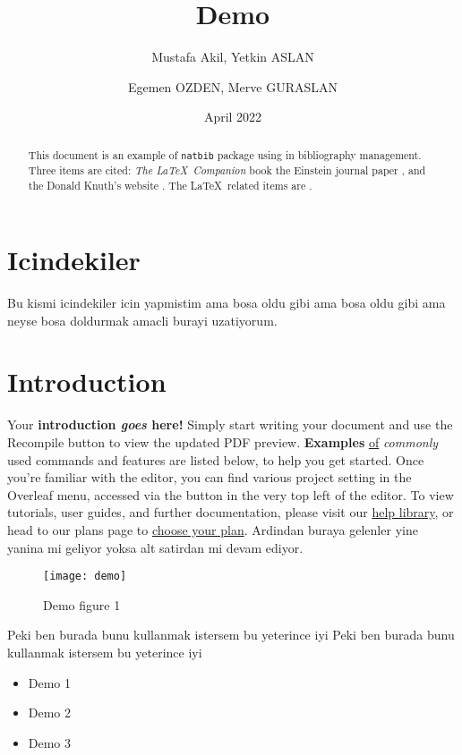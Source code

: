 \documentclass[12pt]{article}
\title{Demo}
\author{Mustafa Akil, Yetkin ASLAN}
\author{Egemen OZDEN, Merve GURASLAN}
\date{April 2022}
\begin{document}
\maketitle

\tableofcontents \newpage

\begin{abstract}
This document is an example of \texttt{natbib} package using in bibliography
management. Three items are cited: \textit{The \LaTeX\ Companion} book 
 the Einstein journal paper \cite{einstein}, and the 
Donald Knuth's website \cite{knuthwebsite}. The \LaTeX\ related items are 
\cite{latexcompanion,knuthwebsite}.
\end{abstract}


\section{Icindekiler}
Bu kismi icindekiler icin yapmistim ama bosa oldu gibi ama bosa oldu gibi ama neyse bosa doldurmak amacli burayi uzatiyorum.

\section{Introduction}
Your \textbf{introduction \emph{goes} here!} Simply start writing your document and use the Recompile button to view the updated PDF preview. \textbf{Examples} \underline{of} \textit{commonly} used commands and features are listed below, to help you get started.  Once you're familiar with the editor, you can find various project setting in the Overleaf menu, accessed via the button in the very top left of the editor. To view tutorials, user guides, and further documentation, please visit our \href{https://www.overleaf.com/learn}{help library}, or head to our plans page to \href{https://www.overleaf.com/user/subscription/plans}{choose your plan}. Ardindan buraya gelenler yine yanina mi geliyor yoksa alt satirdan mi devam ediyor.

\begin{figure}[h]
    \centering
    \texttt{[image: demo]}
    \caption{Demo figure 1}
    \label{fig:demo1}
\end{figure}

Peki ben burada \pageref{fig:demo1} bunu kullanmak istersem bu yeterince iyi
Peki ben burada \pageref{fig:demo1} bunu kullanmak istersem bu yeterince iyi

\begin{itemize}
    \item Demo 1
    \item Demo 2
    \item Demo 3
\end{itemize}
\end{document}
